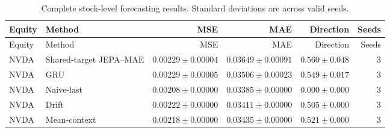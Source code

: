 \begin{longtable}{llrrrr}
\caption{Complete stock-level forecasting results. Standard deviations are across valid seeds.}\label{tab:appendix_stock_metrics}\\
\toprule
Equity & Method & MSE & MAE & Direction & Seeds \\
\midrule
\endfirsthead
\toprule
Equity & Method & MSE & MAE & Direction & Seeds \\
\midrule
\endhead
NVDA & Shared-target JEPA--MAE & $0.00229 \pm 0.00004$ & $0.03649 \pm 0.00091$ & $0.560 \pm 0.048$ & 3 \\
NVDA & GRU & $0.00229 \pm 0.00005$ & $0.03506 \pm 0.00023$ & $0.549 \pm 0.017$ & 3 \\
NVDA & Naive-last & $0.00208 \pm 0.00000$ & $0.03385 \pm 0.00000$ & $0.000 \pm 0.000$ & 3 \\
NVDA & Drift & $0.00222 \pm 0.00000$ & $0.03411 \pm 0.00000$ & $0.505 \pm 0.000$ & 3 \\
NVDA & Mean-context & $0.00218 \pm 0.00000$ & $0.03435 \pm 0.00000$ & $0.521 \pm 0.000$ & 3 \\
\bottomrule
\end{longtable}
